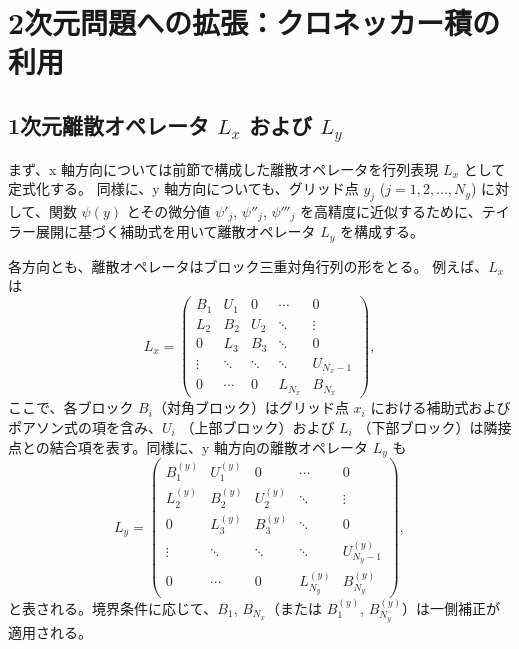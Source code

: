\documentclass[11pt]{article}
\begin{document}
\section{2次元問題への拡張：クロネッカー積の利用}
\subsection{1次元離散オペレータ $L_x$ および $L_y$}
まず、x 軸方向については前節で構成した離散オペレータを行列表現 $L_x$ として定式化する。  
同様に、y 軸方向についても、グリッド点 $y_j$ ($j=1,2,\dots,N_y$) に対して、関数 $\psi(y)$ とその微分値 $\psi'_j$, $\psi''_j$, $\psi'''_j$ を高精度に近似するために、テイラー展開に基づく補助式を用いて離散オペレータ $L_y$ を構成する。\newline

各方向とも、離散オペレータはブロック三重対角行列の形をとる。  
例えば、$L_x$ は
\begin{equation}
  L_x = \begin{pmatrix}
    B_1 & U_1 & 0 & \cdots & 0 \\
    L_2 & B_2 & U_2 & \ddots & \vdots \\
    0 & L_3 & B_3 & \ddots & 0 \\
    \vdots & \ddots & \ddots & \ddots & U_{N_x-1} \\
    0 & \cdots & 0 & L_{N_x} & B_{N_x}
  \end{pmatrix},
  \label{eq:Lx}
\end{equation}
ここで、各ブロック $B_i$（対角ブロック）はグリッド点 $x_i$ における補助式およびポアソン式の項を含み、$U_i$ （上部ブロック）および $L_i$ （下部ブロック）は隣接点との結合項を表す。同様に、y 軸方向の離散オペレータ $L_y$ も
\begin{equation}
  L_y = \begin{pmatrix}
    B^{(y)}_1 & U^{(y)}_1 & 0 & \cdots & 0 \\
    L^{(y)}_2 & B^{(y)}_2 & U^{(y)}_2 & \ddots & \vdots \\
    0 & L^{(y)}_3 & B^{(y)}_3 & \ddots & 0 \\
    \vdots & \ddots & \ddots & \ddots & U^{(y)}_{N_y-1} \\
    0 & \cdots & 0 & L^{(y)}_{N_y} & B^{(y)}_{N_y}
  \end{pmatrix},
  \label{eq:Ly}
\end{equation}
と表される。境界条件に応じて、$B_1$, $B_{N_x}$（または $B^{(y)}_1$, $B^{(y)}_{N_y}$）は一側補正が適用される。
\end{document}
